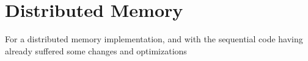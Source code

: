 \section{Distributed Memory}
\label{sec:dist}

For a distributed memory implementation, and with the sequential code having already suffered some changes and optimizations





